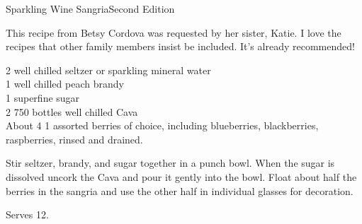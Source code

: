 \begin{entry}{Sparkling Wine Sangria}{Second Edition}

\begin{open}
  This recipe from Betsy Cordova was requested by her sister, Katie. I love the recipes that other family members insist be included. It's already recommended! 
\end{open}
\begin{ingredients}
  \SI{2}{\cup} well chilled seltzer or sparkling mineral water \\
  \SI{1}{\cup} well chilled peach brandy \\
\SI{1}{\cup} superfine sugar \\
 2 \SI{750}{\mill} bottles well chilled Cava \\
 About 4 \SI{1}{\cup} assorted berries of choice, including blueberries, blackberries, raspberries, rinsed and drained. \\
\end{ingredients}
Stir seltzer, brandy, and sugar together in a punch bowl. When the sugar is dissolved uncork the Cava and pour it gently into the bowl. Float about half the berries in the sangria and use the other half in individual glasses for decoration.

Serves 12.
\end{entry}


